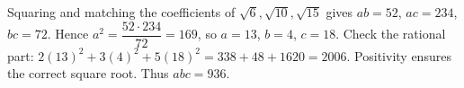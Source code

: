 Squaring and matching the coefficients of $\sqrt6,\sqrt{10},\sqrt{15}$ gives $ab=52$, $ac=234$, $bc=72$. Hence $a^2=\dfrac{52\cdot234}{72}=169$, so $a=13$, $b=4$, $c=18$. Check the rational part: $2(13)^2+3(4)^2+5(18)^2=338+48+1620=2006$. Positivity ensures the correct square root. Thus $\boxed{abc=936}$.
